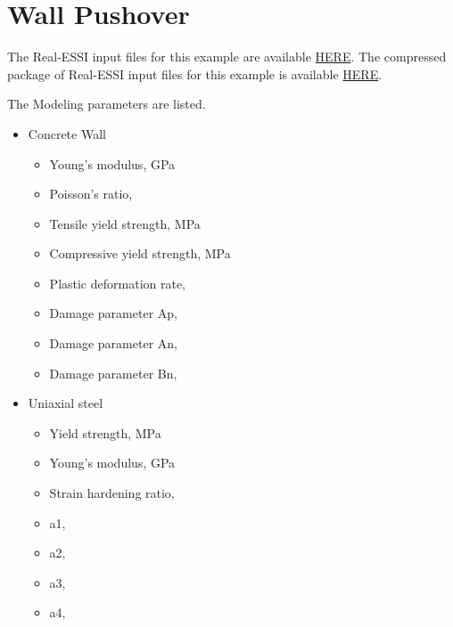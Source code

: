 \clearpage
\newpage
\section{ Wall Pushover}
\label{Wall_Pushover}



The Real-ESSI input files for this example are available 
\href{http://cml01.engr.ucdavis.edu/shortCourse/Day3/Wall_Pushover}{HERE}. 
The compressed package of Real-ESSI input files for this example is available 
\href{http://cml01.engr.ucdavis.edu/shortCourse/Day3/Wall_Pushover/Wall_Pushover.tgz}{HERE}. 


The Modeling parameters are listed.
\begin{itemize}
  \item Concrete  Wall
  \begin{itemize}
    \item Young's modulus, \enspace {} GPa
    \item Poisson's ratio, \enspace {}
    \item Tensile yield strength, \enspace {} MPa
    \item Compressive yield strength, \enspace {} MPa
    \item Plastic deformation rate, \enspace {}
    \item Damage parameter Ap, \enspace {}
    \item Damage parameter An, \enspace {}
    \item Damage parameter Bn, \enspace {}
  \end{itemize}
  \item Uniaxial steel
  \begin{itemize}
    \item Yield strength, \enspace {} MPa
    \item Young's modulus, \enspace {} GPa
    \item Strain hardening ratio, \enspace {}
    \item a1, \enspace {}
    \item a2, \enspace {}
    \item a3, \enspace {}
    \item a4, \enspace {}
  \end{itemize}
\end{itemize}


